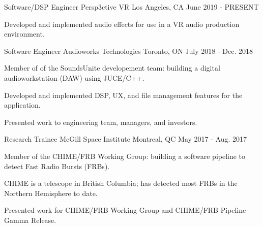 

\begin{cventries}

    \cventry
    {Software/DSP Engineer} %
    {Persp3ctive VR} %
    {Los Angeles, CA} %
    {June 2019 - PRESENT} %
    {
      \begin{cvitems} %
        \item {Developed and implemented audio effects for use in a VR audio production environment.}
      \end{cvitems}
    }

    \cventry
    {Software Engineer} %
    {Audioworks Technologies} %
    {Toronto, ON} %
    {July 2018 - Dec. 2018} %
    {
      \begin{cvitems} %
        \item {Member of of the SoundsUnite developement team: building a digital audioworkstation (DAW) using JUCE/C++.}
        \item {Developed and implemented DSP, UX, and file management features for the application.}
        \item {Presented work to engineering team, managers, and investors.}
      \end{cvitems}
    }

  \cventry
    {Research Trainee} %
    {McGill Space Institute} %
    {Montreal, QC} %
    {May 2017 - Aug. 2017} %
    {
      \begin{cvitems} %
        \item {Member of the CHIME/FRB Working Group: building a software pipeline to detect Fast Radio Bursts (FRBs).}
        \item {CHIME is a telescope in British Columbia; has detected most FRBs in the Northern Hemisphere to date.}
        \item {Presented work for CHIME/FRB Working Group and CHIME/FRB Pipeline Gamma Release.}
      \end{cvitems}
    }


\end{cventries}

